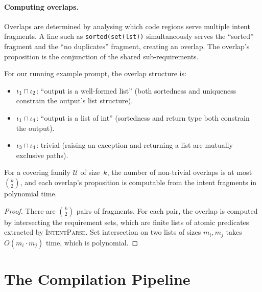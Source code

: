 \documentclass[11pt]{article}
\newcommand{\IntentFrag}{\iota}
\newcommand{\CoverFam}{\mathcal{U}}
\newcommand{\IntentParse}{\textsc{IntentParse}}
\begin{document}
\paragraph{Computing overlaps.}
Overlaps are determined by analysing which code regions serve multiple
intent fragments.  A line such as \texttt{sorted(set(lst))}
simultaneously serves the ``sorted'' fragment and the ``no duplicates''
fragment, creating an overlap.  The overlap's proposition is the
conjunction of the shared sub-requirements.

\begin{example}\label{ex:overlaps}
For our running example prompt, the overlap structure is:
\begin{itemize}[noitemsep]
  \item $\overlap{\IntentFrag_1}{\IntentFrag_2}$: ``output is a
    well-formed list'' (both sortedness and uniqueness constrain the
    output's list structure).
  \item $\overlap{\IntentFrag_1}{\IntentFrag_4}$: ``output is a list
    of int'' (sortedness and return type both constrain the output).
  \item $\overlap{\IntentFrag_3}{\IntentFrag_4}$: trivial (raising an
    exception and returning a list are mutually exclusive paths).
\end{itemize}
\end{example}

\begin{lemma}\label{lem:overlap-finite}
For a covering family $\CoverFam$ of size~$k$, the number of non-trivial
overlaps is at most $\binom{k}{2}$, and each overlap's proposition is
computable from the intent fragments in polynomial time.
\end{lemma}

\begin{proof}
There are $\binom{k}{2}$ pairs of fragments.  For each pair, the
overlap is computed by intersecting the requirement sets, which are
finite lists of atomic predicates extracted by \IntentParse{}.  Set
intersection on two lists of sizes $m_i, m_j$ takes $O(m_i \cdot m_j)$
time, which is polynomial.
\end{proof}

\section{The Compilation Pipeline}\label{sec:pipeline}
\end{document}
